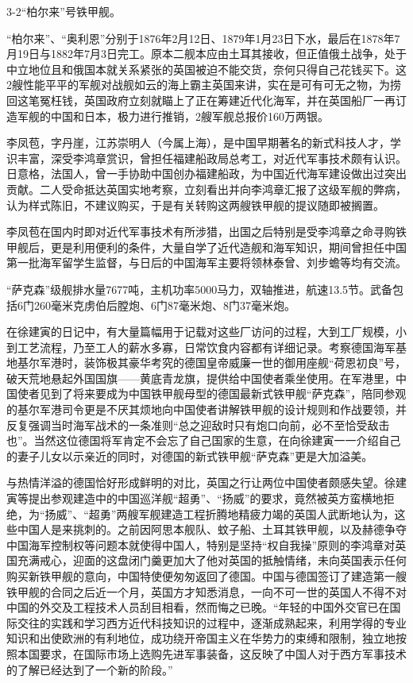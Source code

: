 \documentclass[12pt,UTF8]{ctexbook}
\begin{document}
3-2“柏尔来”号铁甲舰。

“柏尔来”、“奥利恩”分别于1876年2月12日、1879年1月23日下水，最后在1878年7月19日与1882年7月3日完工。原本二舰本应由土耳其接收，但正值俄土战争，处于中立地位且和俄国本就关系紧张的英国被迫不能交货，奈何只得自己花钱买下。这2艘性能平平的军舰对战舰如云的海上霸主英国来讲，实在是可有可无之物，为捞回这笔冤枉钱，英国政府立刻就瞄上了正在筹建近代化海军，并在英国船厂一再订造军舰的中国和日本，极力进行推销，2艘军舰总报价160万两银。

李凤苞，字丹崖，江苏崇明人（今属上海），是中国早期著名的新式科技人才，学识丰富，深受李鸿章赏识，曾担任福建船政局总考工，对近代军事技术颇有认识。日意格，法国人，曾一手协助中国创办福建船政，为中国近代海军建设做出过突出贡献。二人受命抵达英国实地考察，立刻看出并向李鸿章汇报了这级军舰的弊病，认为样式陈旧，不建议购买，于是有关转购这两艘铁甲舰的提议随即被搁置。

李凤苞在国内时即对近代军事技术有所涉猎，出国之后特别是受李鸿章之命寻购铁甲舰后，更是利用便利的条件，大量自学了近代造舰和海军知识，期间曾担任中国第一批海军留学生监督，与日后的中国海军主要将领林泰曾、刘步蟾等均有交流。

“萨克森”级舰排水量7677吨，主机功率5000马力，双轴推进，航速13.5节。武备包括6门260毫米克虏伯后膛炮、6门87毫米炮、8门37毫米炮。

在徐建寅的日记中，有大量篇幅用于记载对这些厂访问的过程，大到工厂规模，小到工艺流程，乃至工人的薪水多寡，日常饮食内容都有详细记录。考察德国海军基地基尔军港时，装饰极其豪华考究的德国皇帝威廉一世的御用座舰“荷恩初良”号，破天荒地悬起外国国旗——黄底青龙旗，提供给中国使者乘坐使用。在军港里，中国使者见到了将来要成为中国铁甲舰母型的德国最新式铁甲舰“萨克森”，陪同参观的基尔军港司令更是不厌其烦地向中国使者讲解铁甲舰的设计规则和作战要领，并反复强调当时海军战术的一条准则“总之迎敌时只有炮口向前，必不至恰受敌击也”。当然这位德国将军肯定不会忘了自己国家的生意，在向徐建寅一一介绍自己的妻子儿女以示亲近的同时，对德国的新式铁甲舰“萨克森”更是大加溢美。

与热情洋溢的德国恰好形成鲜明的对比，英国之行让两位中国使者颇感失望。徐建寅等提出参观建造中的中国巡洋舰“超勇”、“扬威”的要求，竟然被英方蛮横地拒绝，为“扬威”、“超勇”两艘军舰建造工程折腾地精疲力竭的英国人武断地认为，这些中国人是来挑刺的。之前因阿思本舰队、蚊子船、土耳其铁甲舰，以及赫德争夺中国海军控制权等问题本就使得中国人，特别是坚持“权自我操”原则的李鸿章对英国充满戒心，迎面的这盘闭门羹更加大了他对英国的抵触情绪，未向英国表示任何购买新铁甲舰的意向，中国特使便匆匆返回了德国。中国与德国签订了建造第一艘铁甲舰的合同之后近一个月，英国方才知悉消息，一向不可一世的英国人不得不对中国的外交及工程技术人员刮目相看，然而悔之已晚。“年轻的中国外交官已在国际交往的实践和学习西方近代科技知识的过程中，逐渐成熟起来，利用学得的专业知识和出使欧洲的有利地位，成功绕开帝国主义在华势力的束缚和限制，独立地按照本国要求，在国际市场上选购先进军事装备，这反映了中国人对于西方军事技术的了解已经达到了一个新的阶段。”
\end{document}
